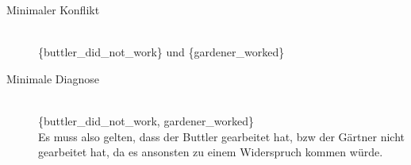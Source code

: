 \documentclass[a4paper,11pt]{article}
\begin{document}
\begin{enumerate}
\begin{description}
    \item[Minimaler Konflikt]  \hfill \\
    \{buttler_did_not_work\} und \{gardener_worked\}

    \item[Minimale Diagnose]  \hfill \\
    \{buttler_did_not_work, gardener_worked\} \\
    Es muss also gelten, dass der Buttler gearbeitet hat, bzw der Gärtner nicht gearbeitet hat, da es ansonsten zu einem Widerspruch kommen würde.
    \end{description}
\newpage



\end{enumerate}
\end{document}
